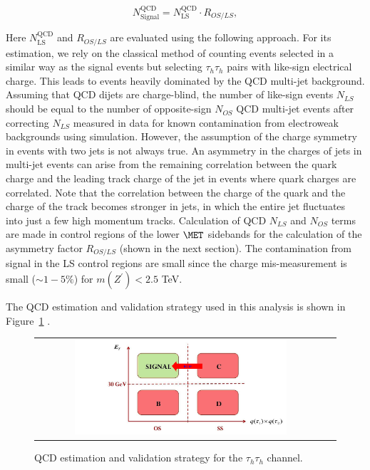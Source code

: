 \begin{equation}                                                                                                                                                      
N_{\textrm{Signal}}^{\textrm{QCD}} = N_{\textrm{LS}}^{\textrm{QCD}} \cdot R_{OS/LS},
\end{equation}
   
Here $N_{\textrm{LS}}^{\textrm{QCD}}$ and $R_{OS/LS}$ are evaluated using the following approach. For its estimation, we rely on the classical method of counting events selected in a similar way as the signal events but selecting $\tau_{h}\tau_{h}$ pairs with like-sign electrical charge. This leads to events heavily dominated by the QCD multi-jet background. Assuming that QCD dijets are charge-blind, the number of like-sign events $N_{LS}$ should be equal to the number of opposite-sign $N_{OS}$ QCD multi-jet events after correcting $N_{LS}$ measured in data for known contamination from electroweak backgrounds using simulation. However, the assumption of the charge symmetry in events with two jets is not always true. An asymmetry in the charges of jets in multi-jet events can arise from the remaining correlation
between the quark charge and the leading track charge of the jet in events where quark charges are correlated. 
Note that the correlation between the charge of the quark and the charge of the track
becomes stronger in jets, in which the entire jet fluctuates into just a few high momentum tracks. Calculation of QCD $N_{LS}$ and $N_{OS}$ terms are made in control regions of the lower $\MET$ sidebands for the calculation of the asymmetry factor $R_{OS/LS}$ (shown in the next section). 
The contamination from signal in the LS control regions are small since the charge mis-measurement is small ($\sim 1-5\%$) for $m(Z^{\prime}) < 2.5$ TeV. 

The QCD estimation and validation strategy used in this analysis is shown in Figure~\ref{fig:qcd} .    

 \begin{figure}[tbh!]
     \centering
     \begin{tabular}{cc}
       \includegraphics[width=0.75\textwidth]{QCD_Strategy.jpg}
     \end{tabular}
     \caption{QCD estimation and validation strategy for the $\tau_{h}\tau_{h}$ channel.}
    \label{fig:qcd}
   \end{figure}


